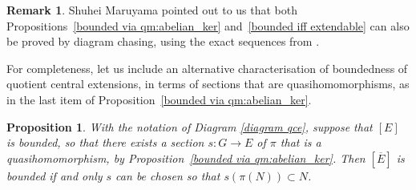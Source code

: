 \documentclass[svgnames]{amsart}
\theoremstyle{plain}
\newtheorem{prop}[thm]{Proposition}
\theoremstyle{definition}
\newtheorem{rem}[thm]{Remark}
\begin{document}
\begin{rem}
    Shuhei Maruyama pointed out to us that both Propositions~\ref{bounded via qm:abelian_ker} and~\ref{bounded iff extendable} can also be proved by diagram chasing, using the exact sequences from \cite{extendable:main}.
\end{rem}

For completeness, let us include an alternative characterisation of boundedness of quotient central extensions, in terms of sections that are quasihomomorphisms, as in the last item of Proposition~\ref{bounded via qm:abelian_ker}.

\begin{prop}
\label{bounded iff compatible section}
    With the notation of Diagram \eqref{diagram qce}, suppose that $[E]$ is bounded, so that there exists a section $s \colon G \to E$ of $\pi$ that is a quasihomomorphism, by Proposition~\ref{bounded via qm:abelian_ker}. Then $[\overline{E}]$ is bounded if and only $s$ can be chosen so that $s(\pi(N)) \subset N$.
\end{prop}
\end{document}
